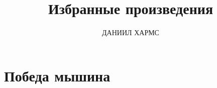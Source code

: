 \documentclass{article}
\title{Избранные произведения}
\author{ДАНИИЛ ХАРМС}
\date{}
\begin{document}
\maketitle
\section*{Победа мышина}

\end{document}
